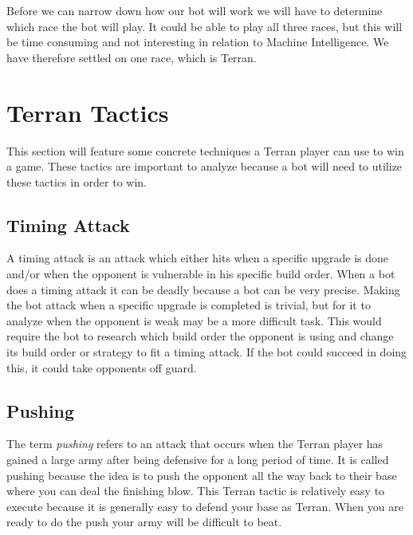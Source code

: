 
Before we can narrow down how our bot will work we will have to determine which race the bot will play. It could be able to play all three races, but 
this will be time consuming and not interesting in relation to Machine Intelligence. We have therefore settled on one race, which is Terran.

\section{Terran Tactics}
	This section will feature some concrete techniques a Terran player can use to win a game. 
	These tactics are important to analyze because a bot will need to utilize these tactics in order to win.
	
	\subsection{Timing Attack}
		A timing attack is an attack which either hits when a specific upgrade is done and/or when the opponent is vulnerable in his specific build order. 
		When a bot does a timing attack it can be deadly because a bot can be very precise. 
		Making the bot attack when a specific upgrade is completed is trivial, but for it to 
		analyze when the opponent is weak may be a more difficult task. 
		This would require the bot to research which build order the opponent is using and change its build order or strategy to fit a timing attack. 
		If the bot could succeed in doing this, it could take opponents off guard.
		
	\subsection{Pushing}
		The term \textit{pushing} refers to an attack that occurs when the Terran player has gained a large army after being defensive for a long 
		period of time. It is called pushing because the idea is to push the opponent 
		all the way back to their base where you can deal the finishing blow. This Terran tactic is relatively easy to execute because it is generally
		easy to defend your base as Terran. When you are ready to do the push your army will be difficult to beat.
		
